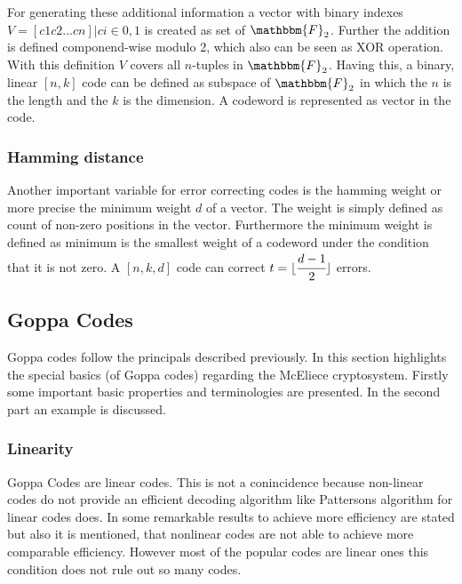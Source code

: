For generating these additional information a vector with binary indexes $V = {[c1 c2...cn] |ci \in {0, 1}}$ is created as set of $\mathbbm{F}_2$. Further the addition is defined componend-wise modulo 2, which also can be seen as XOR operation. With this definition $V$ covers all $n$-tuples in $\mathbbm{F}_2$. 
Having this, a binary, linear $[n, k]$ code can be defined as subspace of $\mathbbm{F}_2$ in which the $n$ is the length and the $k$ is the dimension. A codeword is represented as vector in the code.
 

\subsubsection*{Hamming distance} Another important variable for error correcting codes is the hamming weight or more precise the minimum weight $d$ of a vector. The weight is simply defined as count of non-zero positions in the vector. Furthermore the minimum weight is defined as minimum is the smallest weight of a codeword under the condition that it is not zero. 
A $[n, k, d]$ code can correct $t =  \lfloor \cfrac{d - 1}{2}\rfloor$ errors. 

\subsection*{Goppa Codes}
\label{goppa}
Goppa codes follow the principals described previously. In this section highlights the special basics (of Goppa codes) regarding the McEliece cryptosystem. Firstly some important basic properties and terminologies are presented. In the second part an example is discussed. 

\subsubsection*{Linearity}
Goppa Codes are linear codes. This is not a conincidence because non-linear codes do not provide an efficient decoding algorithm like Pattersons algorithm for linear codes does\cite{patterson1975algebraic}. In \cite{zeng2014nonlinear} some remarkable results to achieve more efficiency are stated but also it is mentioned, that nonlinear codes are not able to achieve more comparable efficiency. 
However most of the popular codes are linear ones this condition does not rule out so many codes.

